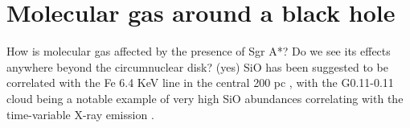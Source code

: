 \section{Molecular gas around a black hole}
How is molecular gas affected by the presence of Sgr A*?  Do we see its effects anywhere beyond the circumnuclear disk?  (yes) SiO has been suggested to be correlated with the Fe 6.4 KeV line in the central 200 pc \citep{JMP00}, with the G0.11-0.11 cloud \citep{Handa} being a notable example of very high SiO abundances correlating with the time-variable X-ray emission \citep{Ponti10}.

